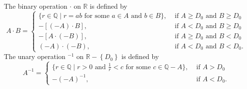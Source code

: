 \begin{definition} %
	\label{real:d:mult}
	The binary operation $\cdot$ on $\mathbb{R}$ is defined by
	$$
		A \cdot B =
		\begin{cases}
			\{ r \in \mathbb{Q} \mid r = a b \text { for some } a \in A \text { and } b \in B \}, & \text{ if } A \geq D_0 \text { and } B \geq D_0 \\
			-[(-A) \cdot B],                                                                      & \text{ if } A < D_0 \text { and } B \geq D_0    \\
			-[A \cdot(-B)],                                                                       & \text{ if } A \geq D_0 \text { and } B < D_0    \\
			(-A) \cdot(-B),                                                                       & \text{ if } A < D_0 \text { and } B < D_0.
		\end{cases}
	$$
	The unary operation ${ }^{-1}$ on $\mathbb{R}-\left\{ D_0 \right\}$ is defined by
	$$
		A^{-1} =
		\begin{cases}
			\{ r \in \mathbb{Q} \mid r > 0 \text { and } \frac{1}{r} < c \text { for some } c \in \mathbb{Q}-A \}, & \text { if } A > D_0  \\
			-(-A)^{-1},                                                                                            & \text { if } A < D_0.
		\end{cases}
	$$
\end{definition}

